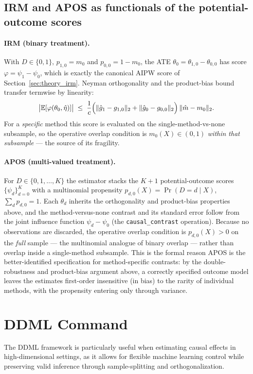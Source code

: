\documentclass [11pt]{article}
\theoremstyle{plain}
\theoremstyle{definition}
\theoremstyle{remark}
\newcommand{\1}{\bm{1}}
\newcommand{\E}{\mathbb{E}}
\begin{document}
\begin{appendices}
\subsection{IRM and APOS as functionals of the potential-outcome scores}\label{sec:theory_irm_apos}

\paragraph{IRM (binary treatment).} With \(D\in\{0,1\}\), \(p_{1,0}=m_0\) and \(p_{0,0}=1-m_0\), the ATE \(\theta_0=\theta_{1,0}-\theta_{0,0}\) has score \(\varphi=\psi_1-\psi_0\), which is exactly the canonical AIPW score of Section~\ref{sec:theory_irm}. Neyman orthogonality and the product-bias bound transfer termwise by linearity:
\[
\bigl|\E[\varphi(\theta_0,\hat\eta)]\bigr|\;\le\;\frac1c\Bigl(\lVert \hat g_1-g_{1,0}\rVert_2+\lVert \hat g_0-g_{0,0}\rVert_2\Bigr)\,\lVert \hat m-m_0\rVert_2 .
\]
For a \emph{specific} method this score is evaluated on the single-method-vs-none subsample, so the operative overlap condition is \(m_0(X)\in(0,1)\) \emph{within that subsample} --- the source of its fragility.

\paragraph{APOS (multi-valued treatment).} For \(D\in\{0,1,\dots,K\}\) the estimator stacks the \(K+1\) potential-outcome scores \(\{\psi_d\}_{d=0}^{K}\) with a multinomial propensity \(p_{d,0}(X)=\Pr(D=d\mid X)\), \(\sum_d p_{d,0}=1\). Each \(\theta_d\) inherits the orthogonality and product-bias properties above, and the method-versus-none contrast and its standard error follow from the joint influence function \(\psi_d-\psi_0\) (the \texttt{causal\_contrast} operation). Because no observations are discarded, the operative overlap condition is \(p_{d,0}(X)>0\) on the \emph{full} sample --- the multinomial analogue of binary overlap --- rather than overlap inside a single-method subsample. This is the formal reason APOS is the better-identified specification for method-specific contrasts: by the double-robustness and product-bias argument above, a correctly specified outcome model leaves the estimates first-order insensitive (in bias) to the rarity of individual methods, with the propensity entering only through variance.


\clearpage
\section{DDML Command}\setcounter{figure}{0}\setcounter{table}{0}\label{DDMLCommand}
The DDML framework is particularly useful when estimating causal effects in high-dimensional settings, as it allows for flexible machine learning control while preserving valid inference through sample-splitting and orthogonalization.


\end{appendices}
\end{document}
